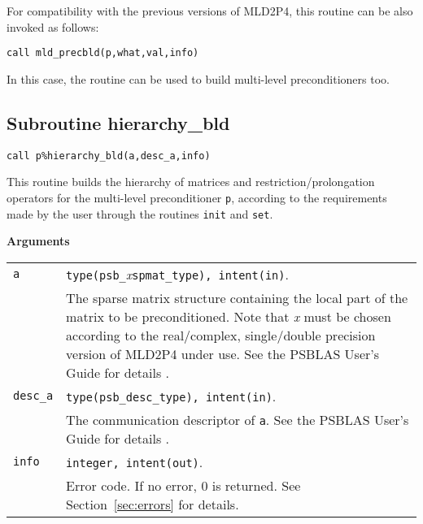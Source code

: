 \baselineskip
For compatibility with the previous versions of MLD2P4, this routine can be also invoked
as follows:

\begin{center}
\verb|call mld_precbld(p,what,val,info)|
\end{center}

\noindent
In this case, the routine can be used to build multi-level preconditioners too.

\clearpage

\subsection{Subroutine hierarchy\_bld\label{sec:hier_bld}}
  
\begin{center}
\verb|call p%hierarchy_bld(a,desc_a,info)|\\
\end{center}

\noindent
This routine builds the hierarchy of matrices and restriction/prolongation
operators for the multi-level preconditioner \verb|p|, according to the requirements
made by the user through the routines \verb|init| and \verb|set|.

{\baselineskip\noindent\large\bfseries Arguments} \smallskip

\begin{tabular}{p{1.2cm}p{12cm}}
\verb|a|      & \verb|type(psb_|\emph{x}\verb|spmat_type), intent(in)|. \\
              & The sparse matrix structure containing the local part of the
                matrix to be preconditioned. Note that \emph{x} must be chosen according
                to the real/complex, 
single/double precision version of MLD2P4 under use.
                See the PSBLAS User's Guide for details \cite{PSBLASGUIDE}.\\
\verb|desc_a| & \verb|type(psb_desc_type), intent(in)|. \\
              & The communication descriptor of \verb|a|. See the PSBLAS User's Guide for
                details \cite{PSBLASGUIDE}.\\
\verb|info|   & \verb|integer, intent(out)|.\\
              & Error code. If no error, 0 is returned. See Section~\ref{sec:errors} for details.\\
\end{tabular}


